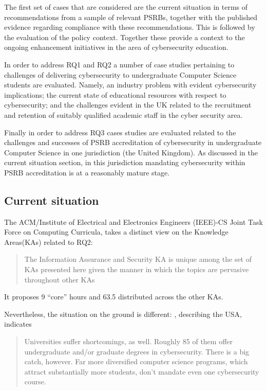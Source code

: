 \documentclass[conference]{IEEEtran}
\begin{document}
The first set of cases that are considered are the current situation in terms of recommendations from a sample of relevant PSRBs,  together with the published evidence regarding compliance with these recommendations. This is followed by the evaluation of the policy context. Together these provide a context to the ongoing enhancement initiatives in the area of cybersecurity education.

In order to address RQ1 and RQ2 a number of case studies pertaining to challenges of delivering cybersecurity to undergraduate Computer Science students are evaluated. Namely,  an industry problem with evident cybersecurity implications;  the current state of educational resources with respect to cybersecurity;  and the challenges evident in the UK related to the recruitment and retention of suitably qualified academic staff in the cyber security area. 

Finally in order to address RQ3 cases studies are evaluated related to the challenges and successes of PSRB accreditation of cybersecurity in undergraduate Computer Science in one jurisdiction (the United Kingdom). As discussed in the current situation section, in this jurisdiction mandating cybersecurity within PSRB accreditation is at a reasonably mature stage.

\subsection{Current situation}
The ACM/Institute of Electrical and Electronics Engineers (IEEE)-CS Joint Task Force on Computing Curricula,\cite[p.~97]{ACM2013a} takes a distinct view on the Knowledge Areas(KAs) related to RQ2:
\begin{quote}
The Information Assurance and Security KA is unique among the set of KAs presented here
given the manner in which the topics are pervasive throughout other KAs
\end{quote}
It proposes 9 ``core'' hours and 63.5 distributed across the other KAs.
\par
Nevertheless, the situation on the ground is different: \cite{Ackerman2019a}, describing the USA, indicates
\begin{quote}
Universities suffer shortcomings, as well. Roughly 85 of them offer undergraduate and/or graduate degrees in cybersecurity. There is a big catch, however. Far more diversified computer science programs, which attract substantially more students, don't mandate even one cybersecurity course.
\end{quote}
\end{document}
